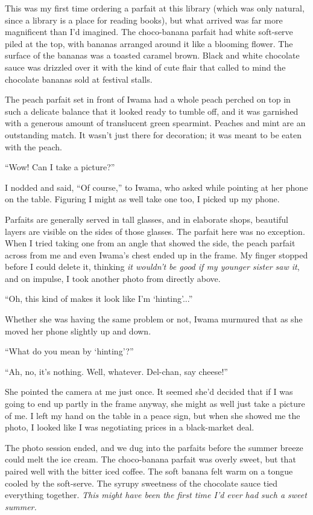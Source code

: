 \documentclass[
    a4paper,
    12pt,
    twoside,
    openany,
    UTF8,
    fontset=windows
]{ctexbook}
\begin{document}
This was my first time ordering a parfait at this library (which was only natural, since a library is a place for reading books), but what arrived was far more magnificent than I'd imagined. The choco-banana parfait had white soft-serve piled at the top, with bananas arranged around it like a blooming flower. The surface of the bananas was a toasted caramel brown. Black and white chocolate sauce was drizzled over it with the kind of cute flair that called to mind the chocolate bananas sold at festival stalls.

The peach parfait set in front of Iwama had a whole peach perched on top in such a delicate balance that it looked ready to tumble off, and it was garnished with a generous amount of translucent green spearmint. Peaches and mint are an outstanding match. It wasn't just there for decoration; it was meant to be eaten with the peach.

``Wow! Can I take a picture?''

I nodded and said, ``Of course,'' to Iwama, who asked while pointing at her phone on the table. Figuring I might as well take one too, I picked up my phone.

Parfaits are generally served in tall glasses, and in elaborate shops, beautiful layers are visible on the sides of those glasses. The parfait here was no exception. When I tried taking one from an angle that showed the side, the peach parfait across from me and even Iwama's chest ended up in the frame. My finger stopped before I could delete it, thinking \textit{it wouldn't be good if my younger sister saw it}, and on impulse, I took another photo from directly above.

``Oh, this kind of makes it look like I'm `hinting'...''

Whether she was having the same problem or not, Iwama murmured that as she moved her phone slightly up and down.

``What do you mean by `hinting'?''

``Ah, no, it's nothing. Well, whatever. Del-chan, say cheese!''

She pointed the camera at me just once. It seemed she'd decided that if I was going to end up partly in the frame anyway, she might as well just take a picture of me. I left my hand on the table in a peace sign, but when she showed me the photo, I looked like I was negotiating prices in a black-market deal.

The photo session ended, and we dug into the parfaits before the summer breeze could melt the ice cream. The choco-banana parfait was overly sweet, but that paired well with the bitter iced coffee. The soft banana felt warm on a tongue cooled by the soft-serve. The syrupy sweetness of the chocolate sauce tied everything together. \textit{This might have been the first time I'd ever had such a sweet summer.}
\end{document}
